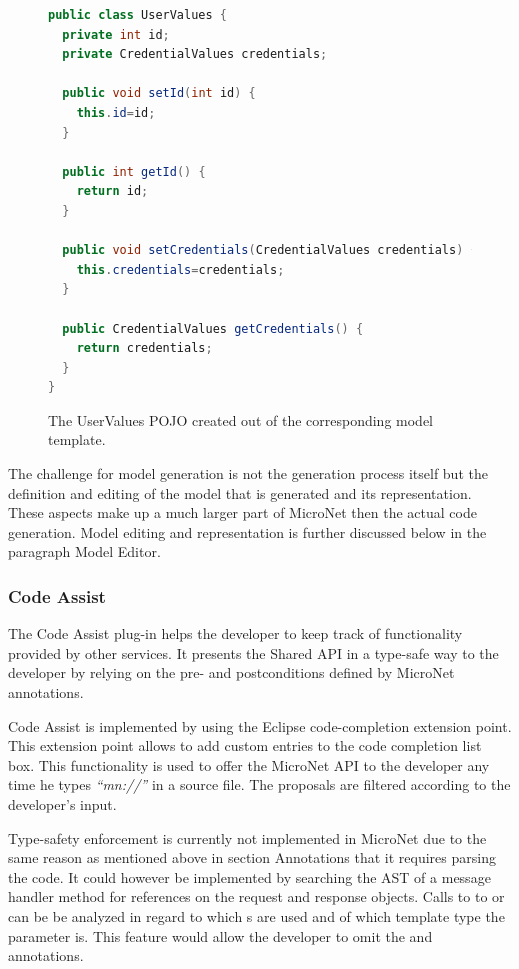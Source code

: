 \begin{figure}
\begin{lstlisting}[language=Java,firstnumber=1] 
public class UserValues {
  private int id;
  private CredentialValues credentials;

  public void setId(int id) {
    this.id=id;
  }

  public int getId() {
    return id;
  }

  public void setCredentials(CredentialValues credentials) {
    this.credentials=credentials;
  }

  public CredentialValues getCredentials() {
    return credentials;
  }
}
\end{lstlisting}
\caption{The UserValues POJO created out of the corresponding model template.}
\label{lst:generated_model_class}
\end{figure}

The challenge for model generation is not the generation process itself but the
definition and editing of the model that is generated and its representation.
These aspects make up a much larger part of MicroNet then the actual code
generation. Model editing and representation is further discussed below in the
paragraph Model Editor.

\subsubsection{Code Assist}

The Code Assist plug-in helps the developer to keep track of functionality
provided by other services. It presents the Shared API in a type-safe way to
the developer by relying on the pre- and postconditions defined by MicroNet
annotations.

Code Assist is implemented by using the Eclipse code-completion extension point.
This extension point allows to add custom entries to the code completion list
box. This functionality is used to offer the MicroNet API to the developer any
time he types \textit{``mn://''} in a source file. The proposals are filtered
according to the developer's input.

Type-safety enforcement is currently not implemented in MicroNet due to the same
reason as mentioned above in section Annotations that it requires parsing the
\ms{} code. It could however be implemented by searching the AST of a message
handler method for references on the request and response objects. Calls to to
 or  can be be analyzed in regard to
which s are used and of which template type the parameter
is. This feature would allow the developer to omit the
 and  annotations.

